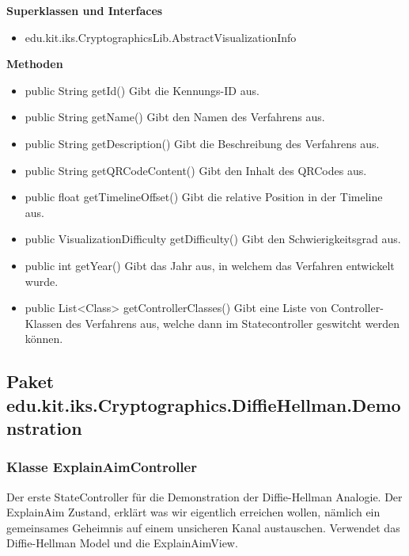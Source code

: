 \documentclass{article}
\begin{document}
      \textbf{Superklassen und Interfaces}
      \begin{itemize}
        \item edu.kit.iks.CryptographicsLib.AbstractVisualizationInfo
      \end{itemize}
      
      \textbf{Methoden}
      \begin{itemize}
        \item public String getId() \newline
        Gibt die Kennungs-ID aus.
        \item public String getName() \newline
        Gibt den Namen des Verfahrens aus.
        \item public String getDescription() \newline
        Gibt die Beschreibung des Verfahrens aus.
        \item public String getQRCodeContent() \newline
        Gibt den Inhalt des QRCodes aus.
        \item public float getTimelineOffset() \newline
        Gibt die relative Position in der Timeline aus.
        \item public VisualizationDifficulty getDifficulty() \newline
        Gibt den Schwierigkeitsgrad aus.
        \item public int getYear() \newline
        Gibt das Jahr aus, in welchem das Verfahren entwickelt wurde.
        \item public List<Class> getControllerClasses() \newline
        Gibt eine Liste von Controller-Klassen des Verfahrens aus, welche dann im Statecontroller geswitcht werden können.
      \end{itemize}

\subsection{Paket edu.kit.iks.Cryptographics.DiffieHellman.Demonstration}

\subsubsection{Klasse ExplainAimController}
      Der erste StateController für die Demonstration der Diffie-Hellman Analogie.
      Der ExplainAim Zustand, erklärt was wir eigentlich erreichen wollen,
      nämlich ein gemeinsames Geheimnis auf einem unsicheren Kanal austauschen.
      Verwendet das Diffie-Hellman Model und die ExplainAimView.
\end{document}
